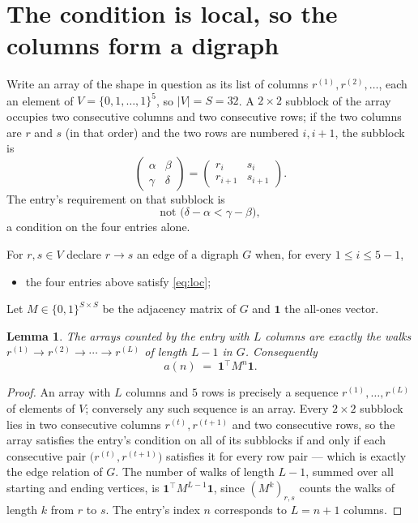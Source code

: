 \documentclass[11pt,a4paper]{article}
\theoremstyle{plain}
\newtheorem{lemma}[theorem]{Lemma}
\theoremstyle{definition}
\begin{document}
\section{The condition is local, so the columns form a digraph}

Write an array of the shape in question as its list of columns
$r^{(1)},r^{(2)},\dots$, each an element of
$V=\{0,1,\dots,1\}^{5}$, so $|V|=S=32$. A $2\times2$ subblock of the array
occupies two consecutive columns and two consecutive rows; if the two columns are $r$
and $s$ (in that order) and the two rows are numbered $i,i+1$,
the subblock is
\[
\begin{pmatrix}\alpha&\beta\\\gamma&\delta\end{pmatrix}=\begin{pmatrix}r_i&s_i\\r_{i+1}&s_{i+1}\end{pmatrix}.
\]
The entry's requirement on that subblock is
\begin{equation}\label{eq:loc}
\text{not }\bigl(\delta-\alpha<\gamma-\beta\bigr),
\end{equation}
a condition on the four entries alone.

For $r,s\in V$ declare $r\to s$ an edge of a digraph $G$ when, for every
$1\le i\le 5-1$,
\begin{itemize}
\item the four entries above satisfy \eqref{eq:loc};

\end{itemize}
Let $M\in\{0,1\}^{S\times S}$ be the adjacency matrix of $G$ and $\mathbf{1}$ the
all-ones vector.

\begin{lemma}\label{lem:walk}
The arrays counted by the entry with $L$ columns are exactly the walks
$r^{(1)}\to r^{(2)}\to\cdots\to r^{(L)}$ of length $L-1$ in $G$. Consequently
\[
a(n)\;=\;\mathbf{1}^{\!\top}M^{n}\mathbf{1} .
\]
\end{lemma}

\begin{proof}
An array with $L$ columns and $5$ rows is precisely a sequence
$r^{(1)},\dots,r^{(L)}$ of elements of $V$; conversely any such sequence is an array.
Every $2\times2$ subblock lies in two consecutive columns $r^{(t)},r^{(t+1)}$ and two
consecutive rows, so the array satisfies the entry's condition on all of its subblocks
if and only if each consecutive pair $\bigl(r^{(t)},r^{(t+1)}\bigr)$ satisfies it for
every row pair --- which is exactly the edge relation of $G$. The number of walks of
length $L-1$, summed over all starting and ending vertices, is
$\mathbf{1}^{\!\top}M^{L-1}\mathbf{1}$, since $(M^{k})_{r,s}$ counts the walks of
length $k$ from $r$ to $s$. The entry's index $n$ corresponds to $L=n+1$ columns.
\end{proof}
\end{document}
